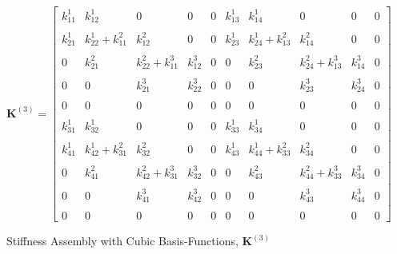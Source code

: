 \begin{figure}
	\centering
	\begin{equation*}
		\mathbf{K}^{\left( 3 \right)} =
		\begin{bmatrix}
			k_{11}^{1} & k_{12}^{1} & 0 & 0 & 0 & k_{13}^{1} & k_{14}^{1} & 0 & 0 & 0 \\ \\
			k_{21}^{1} & k_{22}^{1}+k_{11}^{2} & k_{12}^{2} & 0 & 0 & k_{23}^{1} & k_{24}^{1}+k_{13}^{2} & k_{14}^{2} & 0 & 0 \\ \\
			0 & k_{21}^{2} & k_{22}^{2}+k_{11}^{3} & k_{12}^{3} & 0 & 0 & k_{23}^{2} & k_{24}^{2}+k_{13}^{3} & k_{14}^{3} & 0 \\ \\
			0 & 0 & k_{21}^{3} & k_{22}^{3} & 0 & 0 & 0 & k_{23}^{3} & k_{24}^{3} & 0 \\ \\
			0 & 0 & 0 & 0 & 0 & 0 & 0 & 0 & 0 & 0 \\ \\
			k_{31}^{1} & k_{32}^{1} & 0 & 0 & 0 & k_{33}^{1} & k_{34}^{1} & 0 & 0 & 0 \\ \\
			k_{41}^{1} & k_{42}^{1}+k_{31}^{2} & k_{32}^{2} & 0 & 0 & k_{43}^{1} & k_{44}^{1}+k_{33}^{2} & k_{34}^{2} & 0 & 0 \\ \\
			0 & k_{41}^{2} & k_{42}^{2}+k_{31}^{3} & k_{32}^{3} & 0 & 0 & k_{43}^{2} & k_{44}^{2}+k_{33}^{3} & k_{34}^{3} & 0 \\ \\
			0 & 0 & k_{41}^{3} & k_{42}^{3} & 0 & 0 & 0 & k_{43}^{3} & k_{44}^{3} & 0 \\ \\
			0 & 0 & 0 & 0 & 0 & 0 & 0 & 0 & 0 & 0
		\end{bmatrix}
	\end{equation*}
	\caption{Stiffness Assembly with Cubic Basis-Functions, $\mathbf{K}^{\left( 3 \right)}$}
	\label{fig:K_3_Cubic}
\end{figure}
%
